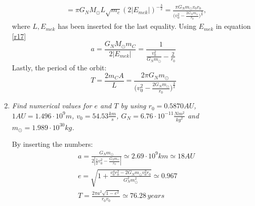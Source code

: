 \begin{example}
\begin{enumerate}
\begin{equation}
\begin{split}
				&=\pi G_NM_\odot L\sqrt{m_c}(2|E_{mek}|)^{-\frac{3}{2}}=\frac{\pi G_N m_\odot v_0r_0}{\big(v_0^2-\frac{2G_Nm_\odot}{r_0}\big)^{\frac{3}{2}}},
			\end{split}
		\end{equation} 
		where $L,E_{mek}$ has been inserted for the last equality. Using $E_{mek}$ in equation \eqref{r17}
		\begin{equation}
			a=\frac{G_N M_\odot m_C}{2|E_{mek}|}=\frac{1}{\frac{v_0^2}{G_Nm_\odot}-\frac{2}{r_0}}
		\end{equation} 
		Lastly, the period of the orbit:
		\begin{equation}
			T=\frac{2m_CA}{L}=\frac{2\pi G_N m_\odot}{\big(v_0^2-\frac{2G_Nm_\odot}{r_0}\big)^{\frac{3}{2}}}
		\end{equation} 
		
		\item \emph{Find numerical values for $e$ and $T$ by using $r_0=0.5870 AU$, $1AU= 1.496\cdot 10^9m$, $v_0=54.53\frac{km}{s}$, $G_N=6.76\cdot 10^{-11}\frac{Nm^2}{kg^2}$ and $m_\odot=1.989\cdot 10^30kg$.}
		
		By inserting the numbers:
		\begin{equation}
			\begin{split}
				&a=\frac{G_Nm_\odot}{2|\frac{1}{2}v_0^2-\frac{G_Nm_\odot}{r_0}|}\simeq 2.69\cdot 10^9 km\simeq 18 AU\\
				&e=\sqrt{1+\frac{v_0^4r_0^2-2G_Nm_\odot v_0^2r_0}{G_N^2m_\odot^2}}\simeq 0.967\\
				&T=\frac{2\pi a^2\sqrt{1-e^2}}{r_0v_0}\simeq 76.28\, years
			\end{split}
		\end{equation} 		
	\end{enumerate}
\end{example}

